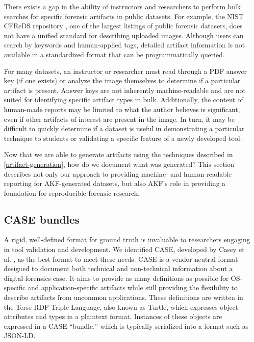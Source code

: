 \documentclass[final,5p,times,twocolumn]{elsarticle}
\begin{document}
There exists a gap in the ability of instructors and researchers to
perform bulk searches for specific forensic artifacts in public
datasets. For example, the NIST CFReDS repository
\cite{nationalinstituteofstandardsandtechnologyCFReDSPortal}, one of
the largest listings of public forensic datasets, does not have a
unified standard for describing uploaded images. Although users can
search by keywords and human-applied tags, detailed artifact information
is not available in a standardized format that can be programmatically
queried.

For many datasets, an instructor or researcher must read through a PDF
answer key (if one exists) or analyze the image themselves to determine
if a particular artifact is present. Answer keys are not inherently
machine-readable and are not suited for identifying specific artifact
types in bulk. Additionally, the content of human-made reports may be
limited to what the author believes is significant, even if other
artifacts of interest are present in the image. In turn, it may be
difficult to quickly determine if a dataset is useful in demonstrating a
particular technique to students or validating a specific feature of a
newly developed tool.

Now that we are able to generate artifacts using the techniques
described in \autoref{artifact-generation}, how do we document what was
generated? This section describes not only our approach to providing
machine- and human-readable reporting for AKF-generated datasets, but
also AKF's role in providing a foundation for reproducible forensic
research.

\subsection{CASE bundles}\label{case-bundles}

A rigid, well-defined format for ground truth is invaluable to
researchers engaging in tool validation and development. We identified
CASE, developed by Casey et al.
\cite{caseyAdvancingCoordinatedCyberinvestigations2017}, as the best
format to meet these needs. CASE is a vendor-neutral format designed to
document both technical and non-technical information about a digital
forensics case. It aims to provide as many definitions as possible for
OS-specific and application-specific artifacts while still providing the
flexibility to describe artifacts from uncommon applications. These
definitions are written in the Terse RDF Triple Language, also known as
Turtle, which expresses object attributes and types in a plaintext
format. Instances of these objects are expressed in a CASE ``bundle,''
which is typically serialized into a format such as JSON-LD.
\end{document}
